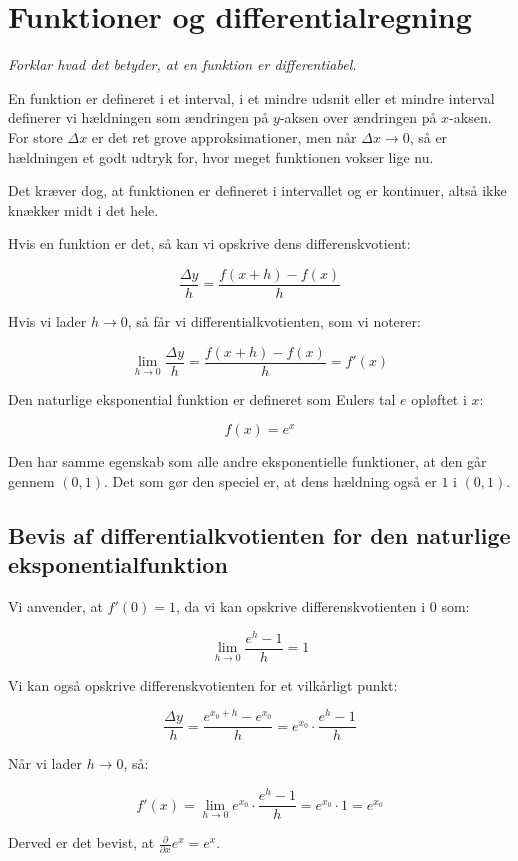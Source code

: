 \section{Funktioner og differentialregning}

\emph{Forklar hvad det betyder, at en funktion er differentiabel.}

En funktion er defineret i et interval, i et mindre udsnit
eller et mindre interval definerer vi hældningen
som ændringen på $y$-aksen over ændringen på $x$-aksen.
For store $\Delta x$ er det ret grove approksimationer,
men når $\Delta x \rightarrow 0$, så er hældningen
et godt udtryk for, hvor meget funktionen vokser lige nu.

Det kræver dog, at funktionen er defineret i intervallet
og er kontinuer, altså ikke knækker midt i det hele.

Hvis en funktion er det, så kan vi opskrive dens differenskvotient:

$$
    \frac{\Delta y}{h}=\frac{f(x+h)-f(x)}{h}
$$

Hvis vi lader $h \rightarrow 0$, så får vi differentialkvotienten, som vi noterer:

$$
    \lim_{h \rightarrow 0}     \frac{\Delta y}{h}=\frac{f(x+h)-f(x)}{h}
    =f'(x)
$$

Den naturlige eksponential funktion er defineret som Eulers tal $e$ opløftet i $x$:

$$f(x)=e^x$$

Den har samme egenskab som alle andre eksponentielle funktioner, at den går gennem $(0,1)$.
Det som gør den speciel er, at dens hældning også er $1$ i $(0,1)$.

\subsection{Bevis af differentialkvotienten for den naturlige eksponentialfunktion}
\begin{proofw}
    Vi anvender, at $f'(0)=1$, da vi kan opskrive differenskvotienten i $0$ som:

    $$
    \lim_{h \rightarrow 0}
    \frac{e^h-1}{h}=1
    $$

    Vi kan også opskrive differenskvotienten for et vilkårligt punkt:

    $$
        \frac{\Delta y}{h}=\frac{e^{x_0+h}-e^{x_0}}{h}=e^{x_0}\cdot \frac{e^h-1}{h}
    $$

    Når vi lader $h \rightarrow 0$, så:

    $$
       f'(x)= \lim_{h \rightarrow 0} e^{x_0} \cdot \frac{e^h-1}{h}=e^{x_0} \cdot 1=e^{x_0}
    $$

    Derved er det bevist, at $\frac{\partial}{\partial x} e^x=e^x$.
\end{proofw}
